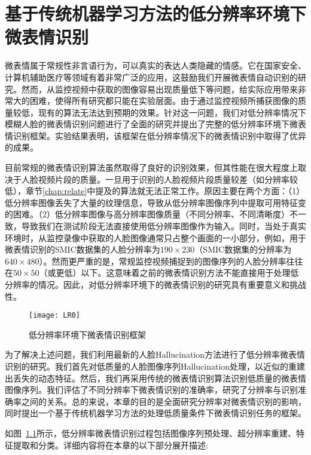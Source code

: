 \chapter{基于传统机器学习方法的低分辨率环境下微表情识别}\label{chap:owner1}

微表情属于常规性非言语行为，可以真实的表达人类隐藏的情感。它在国家安全、计算机辅助医疗等领域有着非常广泛的应用，这鼓励我们开展微表情自动识别的研究。然而，从监控视频中获取的图像容易出现质量低下等问题，给实际应用带来非常大的困难，使得所有研究都只能在实验层面。由于通过监控视频所捕获图像的质量较低，现有的算法无法达到预期的效果。针对这一问题，我们对低分辨率情况下模糊人脸的微表情识别问题进行了全面的研究并提出了完整的低分辨率环境下微表情识别框架。实验结果表明，该框架在低分辨率情况下的微表情识别中取得了优异的成果。

目前常规的微表情识别算法虽然取得了良好的识别效果，但其性能在很大程度上取决于人脸视频片段的质量。一旦用于识别的人脸视频片段质量较差（如分辨率较低），章节\ref{chap:relate}中提及的算法就无法正常工作。原因主要在两个方面：（1）低分辨率图像丢失了大量的纹理信息，导致从低分辨率图像序列中提取可用特征变的困难\citep{lei2011local}。（2）低分辨率图像与高分辨率图像质量（不同分辨率、不同清晰度）不一致，导致我们在测试阶段无法直接使用低分辨率图像作为输入。同时，当处于真实环境时，从监控录像中获取的人脸图像通常只占整个画面的一小部分，例如，用于微表情识别的SMIC数据集的人脸分辨率为$190\times230$（SMIC数据集的分辨率为$640\times480$）。然而更严重的是，常规监控视频捕捉到的图像序列的人脸分辨率往往在$50\times50$（或更低）以下。这意味着之前的微表情识别方法不能直接用于处理低分辨率的情况。因此，对低分辨率环境下的微表情识别的研究具有重要意义和挑战性。

\begin{figure}[!htbp]
    \centering
    \texttt{[image: LR0]}
    \caption{低分辨率环境下微表情识别框架}
    \label{fig10}
\end{figure}

为了解决上述问题，我们利用最新的人脸Hallucination方法进行了低分辨率微表情识别的研究。我们首先对低质量的人脸图像序列Hallucination处理，以近似的重建出丢失的动态特征。然后，我们再采用传统的微表情识别算法识别低质量的微表情图像序列。我们评估了不同分辨率下微表情识别的准确率，研究了分辨率与识别准确率之间的关系。总的来说，本章的目的是全面研究分辨率对微表情识别的影响，同时提出一个基于传统机器学习方法的处理低质量条件下微表情识别任务的框架。

如图~\ref{fig10}所示，低分辨率微表情识别过程包括图像序列预处理、超分辨率重建、特征提取和分类。详细内容将在本章的以下部分展开描述:

